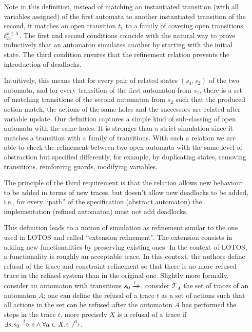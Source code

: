 \documentclass[runningheads]{llncs}
\newcommand{\xrightarrowdbl}[2][]{%
  \xrightarrow[#1]{#2}\mathrel{\mkern-14mu}\rightarrow
}
\begin{document}

Note in this definition, instead of matching an instantiated transition (with all variables assigned) of the first automata to another instantiated transition of the second, it matches an open transition $t_1$ to a family of covering open transitions $t_{2x}^{x\in X}$. %
The first and second conditions coincide with the natural way to prove inductively that an automaton simulates another by starting with the initial state. The third condition ensures that the refinement relation prevents the introduction of deadlocks.

Intuitively, this means that for every pair of related
states $(s_1,s_2)$  of the two automata, and for every  transition of the first automaton from $s_1$, there is a set of matching transitions  of the second automaton  from $s_2$ such that the produced action match, the actions of the same holes and the successors are related after variable update. Our definition captures a simple kind of sub-classing of open automata with the same holes. It is stronger than a strict simulation since it matches a transition with a family of transitions. 
With such a relation we are able to check the refinement between two open automata with the same level of abstraction but specified differently, for example, by duplicating states, removing transitions,  reinforcing  guards, modifying variables. 


The principle of the third requirement is that the relation allows new behaviour to be added in terms of new traces, but doesn't allow new deadlocks to
be added, i.e., for every ``path'' of the specification (abstract automaton) the implementation (refined automaton) must not add deadlocks.

This definition leads to a notion of simulation as refinement similar to the one used in LOTOS \cite{Brinksma:87} and called ``extension refinement''.
The extension consists in adding new functionalities by preserving existing ones.
In the context of LOTOS, a functionality is roughly an acceptable trace.
In this context, the authors define refusal of the trace and constraint refinement so that there is no more refused trace in the refined system than in the original one. Slightly more formally, consider an automaton with transitions $s_0 \xrightarrowdbl{t}$, consider $\mathcal{T}_A$ the set of traces of an automaton $A$; one can define the refusal of a trace $t$ as a set of actions such that all actions in the set can be refused after the automaton $A$ has performed the steps in the trace $t$, more precisely $X$ is a refusal of a trace if $\exists s. s_0  \xrightarrowdbl{t} s \wedge \forall a \in X. s \not{\xrightarrow{a}}$.
\end{document}
